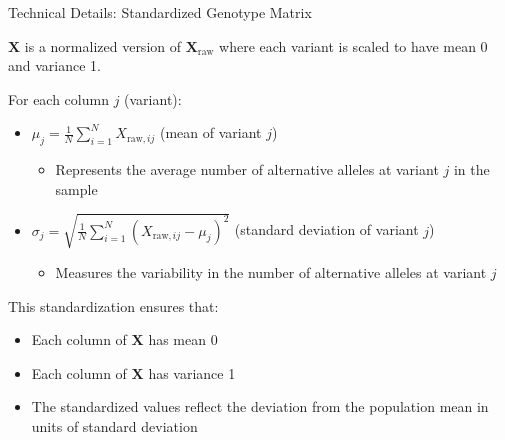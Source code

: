 \begin{frame}{Technical Details: Standardized Genotype Matrix}

$\mathbf{X}$ is a normalized version of $\mathbf{X}_\text{raw}$ where each variant is scaled to have mean 0 and variance 1.

For each column $j$ (variant):
\begin{itemize}
\item $\mu_j = \frac{1}{N}\sum_{i=1}^{N} X_{\text{raw},ij}$ (mean of variant $j$)
\begin{itemize}
\item Represents the average number of alternative alleles at variant $j$ in the sample
\end{itemize}
\end{itemize}

\begin{itemize}
\item $\sigma_j = \sqrt{\frac{1}{N}\sum_{i=1}^{N} (X_{\text{raw},ij} - \mu_j)^2}$ (standard deviation of variant $j$)
\begin{itemize}
\item Measures the variability in the number of alternative alleles at variant $j$
\end{itemize}
\end{itemize}

This standardization ensures that:
\begin{itemize}
\item Each column of $\mathbf{X}$ has mean 0
\item Each column of $\mathbf{X}$ has variance 1
\item The standardized values reflect the deviation from the population mean in units of standard deviation
\end{itemize}
\end{frame}

